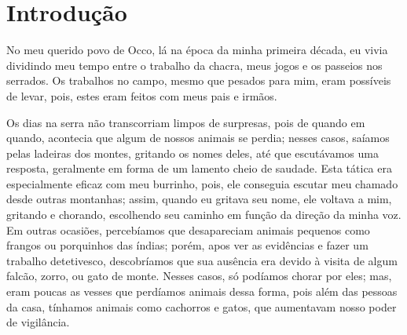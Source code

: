 \cleardoublepage
\newpage
{}
\chapter*{Introdução} %

No meu querido povo de Occo, lá na época da minha primeira década, eu vivia dividindo meu tempo entre o trabalho da chacra, meus jogos e os passeios nos serrados.
Os trabalhos no campo, mesmo que pesados para mim, eram possíveis de levar, pois, estes eram feitos com meus pais e irmãos.

Os dias na serra não transcorriam limpos de surpresas, pois de quando em quando, acontecia que algum de nossos animais se perdia; nesses casos, saíamos pelas ladeiras dos montes, gritando os nomes deles, até que escutávamos uma resposta, geralmente em forma de um lamento cheio de saudade.
Esta tática era especialmente eficaz com meu burrinho, pois, ele conseguia escutar meu chamado desde outras montanhas; assim, quando eu gritava seu nome, ele voltava a mim, gritando e chorando, escolhendo seu caminho em função da direção da minha voz.
Em outras ocasiões, percebíamos que desapareciam animais pequenos como frangos ou porquinhos das índias; porém, apos ver as evidências e fazer um trabalho detetivesco, descobríamos que sua ausência era devido à visita de algum falcão, zorro, ou gato de monte.
Nesses casos, só podíamos chorar por eles; mas,  eram poucas as vesses que perdíamos animais dessa forma, pois além das pessoas da casa, tínhamos animais como cachorros e gatos, que aumentavam nosso poder de vigilância.

